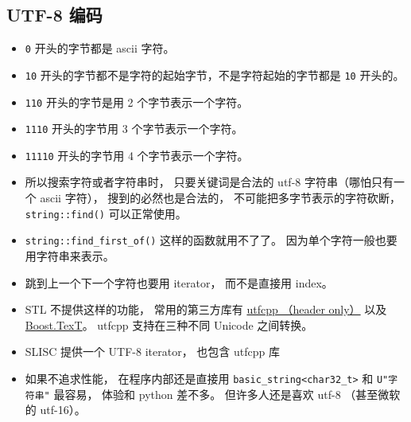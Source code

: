 \subsection{UTF-8 编码}

\begin{itemize}
\item \verb|0| 开头的字节都是 ascii 字符。
\item \verb|10| 开头的字节都不是字符的起始字节，不是字符起始的字节都是 \verb|10| 开头的。
\item \verb|110| 开头的字节是用 2 个字节表示一个字符。
\item \verb|1110| 开头的字节用 3 个字节表示一个字符。
\item \verb|11110| 开头的字节用 4 个字节表示一个字符。
\item 所以搜索字符或者字符串时， 只要关键词是合法的 utf-8 字符串（哪怕只有一个 ascii 字符）， 搜到的必然也是合法的， 不可能把多字节表示的字符砍断， \verb|string::find()| 可以正常使用。
\item \verb|string::find_first_of()| 这样的函数就用不了了。 因为单个字符一般也要用字符串来表示。
\item 跳到上一个下一个字符也要用 iterator， 而不是直接用 index。
\item STL 不提供这样的功能， 常用的第三方库有 \href{https://github.com/nemtrif/utfcpp}{utfcpp （header only）} 以及 \href{https://tzlaine.github.io/text/doc/html/index.html}{Boost.TexT}。 utfcpp 支持在三种不同 Unicode 之间转换。
\item SLISC 提供一个 UTF-8 iterator， 也包含 utfcpp 库
\item 如果不追求性能， 在程序内部还是直接用 \verb|basic_string<char32_t>| 和 \verb|U"字符串"| 最容易， 体验和 python 差不多。 但许多人还是喜欢 utf-8 （甚至微软的 utf-16）。
\end{itemize}

